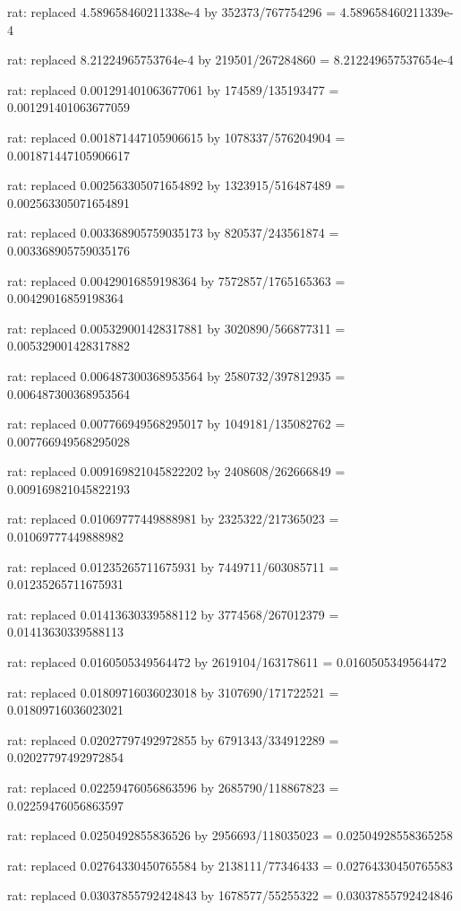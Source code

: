 \documentclass[a4paper,10pt]{article}
\begin{document}
\begin{eulernotebook}
\begin{eulercomment}
\begin{eulercomment}
\begin{eulercomment}
\begin{eulercomment}
\begin{eulercomment}
\begin{eulercomment}
\begin{eulercomment}
\begin{eulercomment}
\begin{eulercomment}
\begin{eulercomment}
\begin{eulercomment}
\begin{eulercomment}
\begin{eulercomment}
\begin{eulercomment}
\begin{eulercomment}
\begin{eulercomment}
\begin{euleroutput}
  rat: replaced 4.589658460211338e-4 by 352373/767754296 = 4.589658460211339e-4
  
  rat: replaced 8.21224965753764e-4 by 219501/267284860 = 8.212249657537654e-4
  
  rat: replaced 0.001291401063677061 by 174589/135193477 = 0.001291401063677059
  
  rat: replaced 0.001871447105906615 by 1078337/576204904 = 0.001871447105906617
  
  rat: replaced 0.002563305071654892 by 1323915/516487489 = 0.002563305071654891
  
  rat: replaced 0.003368905759035173 by 820537/243561874 = 0.003368905759035176
  
  rat: replaced 0.00429016859198364 by 7572857/1765165363 = 0.00429016859198364
  
  rat: replaced 0.005329001428317881 by 3020890/566877311 = 0.005329001428317882
  
  rat: replaced 0.006487300368953564 by 2580732/397812935 = 0.006487300368953564
  
  rat: replaced 0.007766949568295017 by 1049181/135082762 = 0.007766949568295028
  
  rat: replaced 0.009169821045822202 by 2408608/262666849 = 0.009169821045822193
  
  rat: replaced 0.01069777449888981 by 2325322/217365023 = 0.01069777449888982
  
  rat: replaced 0.01235265711675931 by 7449711/603085711 = 0.01235265711675931
  
  rat: replaced 0.01413630339588112 by 3774568/267012379 = 0.01413630339588113
  
  rat: replaced 0.0160505349564472 by 2619104/163178611 = 0.0160505349564472
  
  rat: replaced 0.01809716036023018 by 3107690/171722521 = 0.01809716036023021
  
  rat: replaced 0.02027797492972855 by 6791343/334912289 = 0.02027797492972854
  
  rat: replaced 0.02259476056863596 by 2685790/118867823 = 0.02259476056863597
  
  rat: replaced 0.0250492855836526 by 2956693/118035023 = 0.02504928558365258
  
  rat: replaced 0.02764330450765584 by 2138111/77346433 = 0.02764330450765583
  
  rat: replaced 0.03037855792424843 by 1678577/55255322 = 0.03037855792424846
  

\end{euleroutput}
\end{eulercomment}
\end{eulercomment}
\end{eulercomment}
\end{eulercomment}
\end{eulercomment}
\end{eulercomment}
\end{eulercomment}
\end{eulercomment}
\end{eulercomment}
\end{eulercomment}
\end{eulercomment}
\end{eulercomment}
\end{eulercomment}
\end{eulercomment}
\end{eulercomment}
\end{eulercomment}
\end{eulernotebook}
\end{document}
